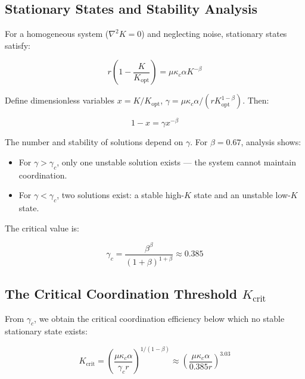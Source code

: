 \documentclass[12pt,a4paper]{article}
\theoremstyle{remark}
\newcommand{\Keffopt}{K_{\mathrm{opt}}}
\newcommand{\Keffcrit}{K_{\mathrm{crit}}}
\newcommand{\kappac}{\kappa_c}
\begin{document}
	\subsection{Stationary States and Stability Analysis}
	
	For a homogeneous system ($\nabla^2 K = 0$) and neglecting noise, stationary states satisfy:
	
	\begin{equation}
		r \left(1 - \frac{K}{\Keffopt}\right) = \mu \kappac \alpha K^{-\beta}
		\label{eq:stationary}
	\end{equation}
	
	Define dimensionless variables $x = K/\Keffopt$, $\gamma = \mu \kappac \alpha / (r \Keffopt^{1-\beta})$. Then:
	
	\begin{equation}
		1 - x = \gamma x^{-\beta}
		\label{eq:dimensionless}
	\end{equation}
	
	The number and stability of solutions depend on $\gamma$. For $\beta = 0.67$, analysis shows:
	
	\begin{itemize}
		\item For $\gamma > \gamma_c$, only one unstable solution exists — the system cannot maintain coordination.
		\item For $\gamma < \gamma_c$, two solutions exist: a stable high-$K$ state and an unstable low-$K$ state.
	\end{itemize}
	
	The critical value is:
	
	\begin{equation}
		\gamma_c = \frac{\beta^{\beta}}{(1+\beta)^{1+\beta}} \approx 0.385
		\label{eq:gamma_c}
	\end{equation}
	
	\subsection{The Critical Coordination Threshold $\Keffcrit$}
	
	From $\gamma_c$, we obtain the critical coordination efficiency below which no stable stationary state exists:
	
	\begin{equation}
		\Keffcrit = \left( \frac{\mu \kappac \alpha}{\gamma_c r} \right)^{1/(1-\beta)} \approx \left( \frac{\mu \kappac \alpha}{0.385 r} \right)^{3.03}
		\label{eq:Kcrit}
	\end{equation}
	
\end{document}
